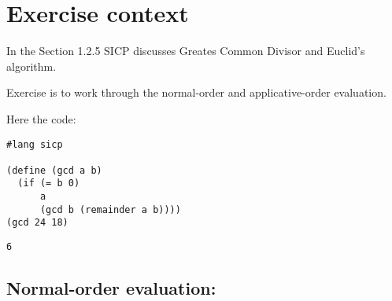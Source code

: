 \documentclass[11pt]{article}
\author{LMG}
\date{\today}
\title{}
\begin{document}
\tableofcontents

\section{Exercise context}
\label{sec:orgd575b89}
In the Section 1.2.5 SICP discusses Greates Common Divisor and Euclid's
algorithm.

Exercise is to work through the normal-order and applicative-order evaluation.

Here the code:
\begin{verbatim}
#lang sicp

(define (gcd a b)
  (if (= b 0)
      a
      (gcd b (remainder a b))))
(gcd 24 18)
\end{verbatim}

\begin{verbatim}
6
\end{verbatim}


\subsection{Normal-order evaluation:}
\label{sec:org78db0d2}
\end{document}
